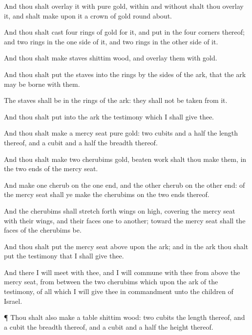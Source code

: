 {And thou shalt
overlay it with
pure
gold,
within and
without shalt thou
overlay it, and shalt
make upon it a
crown of
gold round
about.

And thou shalt
cast
four
rings of
gold for it, and
put
{} in the
four
corners thereof; and
two
rings
{} in the
one
side of it, and
two
rings in the
other side of it.

And thou shalt
make
staves
{}
shittim
wood, and
overlay them with
gold.

And thou shalt
put the
staves into the
rings by the
sides of the
ark, that the
ark may be
borne with them.

The
staves shall
be in the
rings of the
ark: they shall not be
taken from it.

And thou shalt
put into the
ark the
testimony which I shall
give thee.

And thou shalt
make a mercy
seat
{}
pure
gold: two
cubits and a
half
{} the
length thereof, and a
cubit and a
half the
breadth thereof.

And thou shalt
make
two
cherubims
{}
gold,
{} beaten
work shalt thou
make them, in the
two
ends of the mercy
seat.

And
make
one
cherub on the one
end, and the
other
cherub on the
other
end:
{} of the mercy
seat shall ye
make the
cherubims on the
two
ends thereof.

And the
cherubims shall
stretch forth
{}
wings on
high,
covering the mercy
seat with their
wings, and their
faces
{}
one to
another; toward the mercy
seat shall the
faces of the
cherubims be.

And thou shalt
put the mercy
seat
above upon the
ark; and in the
ark thou shalt
put the
testimony that I shall
give thee.

And there I will
meet with thee, and I will
commune with thee from above the mercy
seat, from
between the
two
cherubims which
{}
upon the
ark of the
testimony, of all
{} which I will give thee in
commandment unto the
children of
Israel.


\par }{\PP {}¶ Thou shalt also
make a
table
{}
shittim
wood: two
cubits
{} the
length thereof, and a
cubit the
breadth thereof, and a
cubit and a
half the
height thereof.

}
